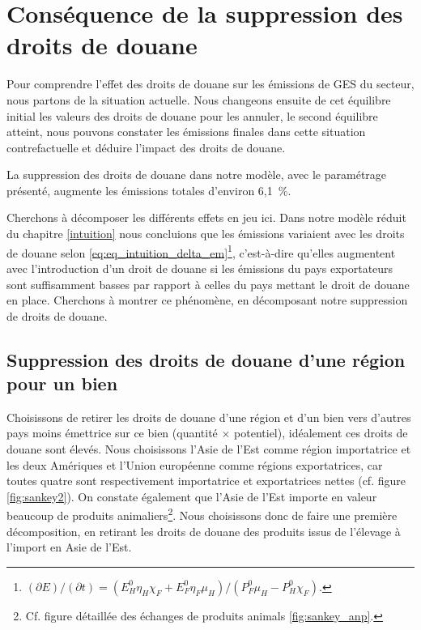\section{Conséquence de la suppression des droits de douane}

Pour comprendre l'effet des droits de douane sur les émissions de GES du secteur, nous partons de la situation actuelle. Nous changeons ensuite de cet équilibre initial les valeurs des droits de douane pour les annuler, le second équilibre atteint, nous pouvons constater les émissions finales dans cette situation contrefactuelle et déduire l'impact des droits de douane.

La suppression des droits de douane dans notre modèle, avec le paramétrage présenté, augmente les émissions totales d'environ 6,1~\%.

Cherchons à décomposer les différents effets en jeu ici. Dans notre modèle réduit du chapitre \ref{intuition} nous concluions que les émissions variaient avec les droits de douane selon \ref{eq:eq_intuition_delta_em}\footnote{$\left({\partial E}\right)/\left( {\partial t} \right) = \left( {E_H^0 \eta_H \chi_F + E_F^0 \eta_F \mu_H} \right)/\left( {P_F^0 \mu_H - P_H^0 \chi_F} \right).$}, c'est-à-dire qu'elles augmentent avec l'introduction d'un droit de douane si les émissions du pays exportateurs sont suffisamment basses par rapport à celles du pays mettant le droit de douane en place. Cherchons à montrer ce phénomène, en décomposant notre suppression de droits de douane.

\subsection{Suppression des droits de douane d'une région pour un bien}\label{subsec:ae_anp}

Choisissons de retirer les droits de douane d'une région et d'un bien vers d'autres pays moins émettrice sur ce bien (quantité $\times$ potentiel), idéalement ces droits de douane sont élevés. Nous choisissons l'Asie de l'Est comme région importatrice et les deux Amériques et l'Union européenne comme régions exportatrices, car toutes quatre sont respectivement importatrice et exportatrices nettes (cf. figure \ref{fig:sankey2}). On constate également que l'Asie de l'Est importe en valeur beaucoup de produits animaliers\footnote{Cf. figure détaillée des échanges de produits animals \ref{fig:sankey_anp}.}. Nous choisissons donc de faire une première décomposition, en retirant les droits de douane des produits issus de l’élevage à l’import en Asie de l’Est.

